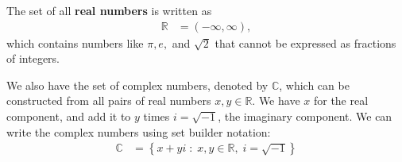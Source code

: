 \documentclass{article}[12pt]
\newtheorem{proposition}{Proposition}
\newtheorem{exercise}{Exercise}
\newcommand{\Z}{\mathbb{Z}}
\newcommand{\R}{\mathbb{R}}
\newcommand{\C}{\mathbb{C}}
\newcommand{\textbox}[1]{\fbox{\parbox{\textwidth}{#1}}}
\begin{document}
        The set of all \textbf{real numbers} is written as
        \begin{align}
            \R
            &= (-\infty, \infty), \label{reals-interval}
        \end{align}
        which contains numbers like $\pi, e,$ and $\sqrt{2}$ that cannot be expressed as fractions of integers.
        
        
        We also have the set of complex numbers, denoted by $\C$, which can be constructed from all pairs of real numbers $x, y \in \R$. We have $x$ for the real component, and add it to $y$ times $i = 
        \sqrt{-1}$, the imaginary component. We can write the complex numbers using set builder notation:
        \begin{align}
            \C
            &= \left\{ x + y i \; : \; x, y \in \R, \; i = \sqrt{-1} \label{complex} \right\}
        \end{align}
        
        
\end{document}
